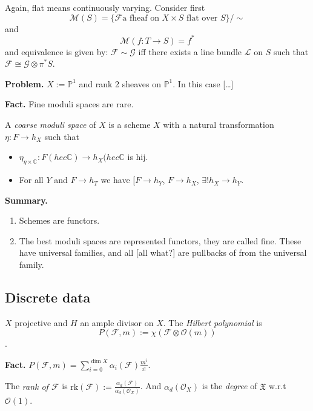 \bigskip\noindent

Again, flat means continuously varying. Consider first
$$
\mathcal{M}(S)=\{\mathcal{F}\text{a fheaf on $X\times S$ flat over }S\}/\sim
$$
and
$$
\mathcal{M}(f:T \to S)=f^*
$$
and equivalence is given by: $\mathcal{F}\sim \mathcal{G}$ iff there exists a
line bundle $\mathcal{L}$ on $S$ such that 
$\mathcal{F}\cong \mathcal{G}\otimes\pi^*S$.

{\bf Problem.} $X:=\mathbb{P}^1$ and rank 2 sheaves on $\mathbb{P}^1$. In this
case […]

{\bf Fact.} Fine moduli spaces are rare.

\begin{definition}
\label{definition-coarse-moduli-space}
A {\it coarse moduli space} of  $X$ is a scheme $X$ with a natural
transformation $\eta:F \to h_X$ such that
\begin{itemize}
\item $\eta_{\eta \times \mathbb{C}}:F(hec \mathbb{C}) \to h_X(hec \mathbb{C}$
is hij.
\item For all $Y$ and $F \to h_T$ we have [$F \to h_Y$, $F\to h_X$, $\exists !
h_X \to h_Y$.
\end{itemize}
\end{definition}

{\bf Summary.}
\begin{enumerate}
\item Schemes are functors.
\item The best moduli spaces are represented functors, they are called fine.
These have universal families, and all [all what?] are pullbacks of from the
universal family.
\end{enumerate}

\subsection*{Discrete data}
\label{subsection-discrete-data}

$X$ projective and $H$ an ample divisor on $X$. The {\it Hilbert polynomial} is
$$
P(\mathcal{F},m):=\chi(\mathcal{F}\otimes \mathcal{O}(m))
$$.

{\bf Fact.} $P(\mathcal{F},m)=\sum_{i=0}^{\dim
X}\alpha_i(\mathcal{F})\frac{m^i}{i!}$.

The {\it rank of $\mathcal{F}$} is
$\text{rk}(\mathcal{F}):=\frac{\alpha_d(\mathcal{F})}{\alpha_d(\mathcal{O}_X)}$.
And $\alpha_d(\mathcal{O}_X)$ is the {\it degree} of $\mathfrak{X}$ w.r.t
$\mathcal{O}(1)$.

